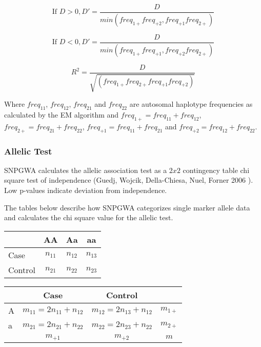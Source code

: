 \begin{equation*}
\text{If } D > 0, D' = \frac{D}{min\left(freq_{1+}freq_{+2}, freq_{+1}freq_{2+}\right)}
\end{equation*}

\begin{equation*}
  \text{If } D < 0, D' = \frac{D}{min\left(freq_{1+}freq_{+1}, freq_{+2}freq_{2+}\right)}
\end{equation*}

\begin{equation*}
  R^2 = \frac{D}{\sqrt{\left(freq_{1+}freq_{2+}freq_{+1}freq_{+2}\right)}}
\end{equation*}

Where $freq_{11}$, $freq_{12}$, $freq_{21}$ and $freq_{22}$ are autosomal
haplotype frequencies as calculated by the EM algorithm and
$freq_{1+} = freq_{11} + freq_{12}$, $freq_{2+} = freq_{21} + freq_{22}$,
$freq_{+1} = freq_{11} + freq_{21}$ and $freq_{+2} = freq_{12} + freq_{22}$.

\subsubsection{Allelic Test}

SNPGWA calculates the allelic association test as a $2 x 2$ contingency table
chi square test of independence (Guedj, Wojcik, Della-Chiesa, Nuel, Forner 2006
\cite{Guedj06}).  Low p-values indicate deviation from independence.

The tables below describe how SNPGWA categorizes single marker allele data and
calculates the chi square value for the allelic test.

\begin{center}
  \begin{tabular}{lccc}
    \hline
    {}     & \textbf{AA} & \textbf{Aa} & \textbf{aa} \\
    \hline
    Case    & $n_{11}$ & $n_{12}$ & $n_{13}$ \\
    Control & $n_{21}$ &  $n_{22}$ & $n_{23}$ \\
    \hline
  \end{tabular}
\end{center}

\begin{center}
  \begin{tabular}{lccc}
    \hline
    {} & Case & Control & {} \\
    \hline
    A  & $m_{11} = 2n_{11} + n_{12}$ & $m_{12} = 2n_{13} + n_{12}$ & $m_{1+}$ \\
    a  & $m_{21} = 2n_{21} + n_{22}$ & $m_{22} = 2n_{23} + n_{22}$ & $m_{2+}$ \\
    {} & $m_{+1}$                  & $m_{+2}$                   & $m$     \\
    \hline
  \end{tabular}
\end{center}

